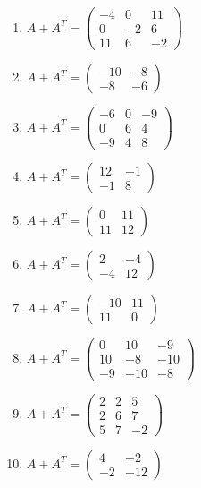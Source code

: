 \begin{enumerate}[label=\arabic*., leftmargin=*, itemsep=1pt]
\item $A+A^T=\left(\begin{smallmatrix}-4 & 0 & 11\\ 0 & -2 & 6\\ 11 & 6 & -2\end{smallmatrix}\right)$
\item $A+A^T=\left(\begin{smallmatrix}-10 & -8\\ -8 & -6\end{smallmatrix}\right)$
\item $A+A^T=\left(\begin{smallmatrix}-6 & 0 & -9\\ 0 & 6 & 4\\ -9 & 4 & 8\end{smallmatrix}\right)$
\item $A+A^T=\left(\begin{smallmatrix}12 & -1\\ -1 & 8\end{smallmatrix}\right)$
\item $A+A^T=\left(\begin{smallmatrix}0 & 11\\ 11 & 12\end{smallmatrix}\right)$
\item $A+A^T=\left(\begin{smallmatrix}2 & -4\\ -4 & 12\end{smallmatrix}\right)$
\item $A+A^T=\left(\begin{smallmatrix}-10 & 11\\ 11 & 0\end{smallmatrix}\right)$
\item $A+A^T=\left(\begin{smallmatrix}0 & 10 & -9\\ 10 & -8 & -10\\ -9 & -10 & -8\end{smallmatrix}\right)$
\item $A+A^T=\left(\begin{smallmatrix}2 & 2 & 5\\ 2 & 6 & 7\\ 5 & 7 & -2\end{smallmatrix}\right)$
\item $A+A^T=\left(\begin{smallmatrix}4 & -2\\ -2 & -12\end{smallmatrix}\right)$

\end{enumerate}
